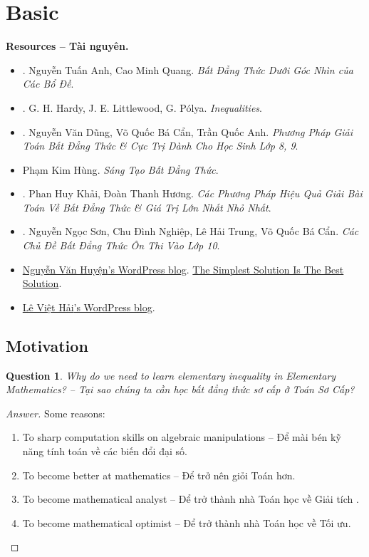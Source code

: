 \documentclass{article}
\newtheorem{question}{Question}
\begin{document}
\section{Basic}
\textbf{\textsf{Resources -- Tài nguyên.}}
\begin{itemize}
	\item \cite{Anh_Quang_bdt_lem}. {\sc Nguyễn Tuấn Anh, Cao Minh Quang}. {\it Bất Đẳng Thức Dưới Góc Nhìn của Các Bổ Đề}.
	\item \cite{Hardy_Littlewood_Polya1952}. {\sc G. H. Hardy, J. E. Littlewood, G. P\'{o}lya}. {\it Inequalities}.
	\item \cite{Dung_Can_Anh_bdt_8_9}. {\sc Nguyễn Văn Dũng, Võ Quốc Bá Cẩn, Trần Quốc Anh}. {\it Phương Pháp Giải Toán Bất Đẳng Thức \& Cực Trị Dành Cho Học Sinh Lớp 8, 9}.
	\item {\sc Phạm Kim Hùng}. {\it Sáng Tạo Bất Đẳng Thức}.
	\item \cite{Khai_Huong_bdt}. {\sc Phan Huy Khải, Đoàn Thanh Hương}. {\it Các Phương Pháp Hiệu Quả Giải Bài Toán Về Bất Đẳng Thức \& Giá Trị Lớn Nhất Nhỏ Nhất}.
	\item \cite{Son_Nghiep_Trung_Can_bdt}. {\sc Nguyễn Ngọc Sơn, Chu Đình Nghiệp, Lê Hải Trung, Võ Quốc Bá Cẩn}. {\it Các Chủ Đề Bất Đẳng Thức Ôn Thi Vào Lớp 10}.
	\item \href{https://nguyenhuyenag.wordpress.com/}{{\sc Nguyễn Văn Huyện}'s WordPress blog}. \href{https://mathifc.wordpress.com/}{The Simplest Solution Is The Best Solution}.
	\item \href{https://leviethai.wordpress.com}{{\sc Lê Việt Hải}'s WordPress blog}.
\end{itemize}

\subsection{Motivation}

\begin{question}
	Why do we need to learn elementary inequality in Elementary Mathematics? -- Tại sao chúng ta cần học bất đẳng thức sơ cấp ở Toán Sơ Cấp?
\end{question}

\begin{proof}[Answer]
	Some reasons:
	\begin{enumerate}
		\item To sharp computation skills on algebraic manipulations -- Để mài bén kỹ năng tính toán về các biến đổi đại số.
		\item To become better at mathematics -- Để trở nên giỏi Toán hơn.
		\item To become mathematical analyst -- Để trở thành nhà Toán học về Giải tích .
		\item To become mathematical optimist -- Để trở thành nhà Toán học về Tối ưu.
	\end{enumerate}	
\end{proof}
\end{document}
